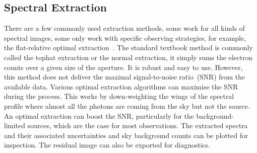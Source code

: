\documentclass[fleqn,usenatbib]{mnras}
\begin{document}
\subsection{Spectral Extraction}
\label{sec:extract}
There are a few commonly used extraction methods, some work for
all kinds of spectral images, some only work with specific
observing strategies, for example, the flat-relative optimal
extraction~\citep{2014A&A...561A..59Z}. The standard textbook
method is commonly called the tophat extraction or the normal
extraction, it simply sums the electron counts over a given
size of the aperture. It is robust and easy to use. However, this
method does not deliver the maximal signal-to-noise ratio~(SNR)
from the available data. Various optimal extraction algorithms
can maximise the SNR during the process. This works by
down-weighting the wings of the spectral profile where almost
all the photons are coming from the sky but not the source. An
optimal extraction can boost the SNR, particularly for the
background-limited sources, which are the case for most
observations. The extracted spectra and their associated
uncertainties and sky background counts can be plotted for
inspection. The residual image can also be exported for
diagnostics.
\end{document}
